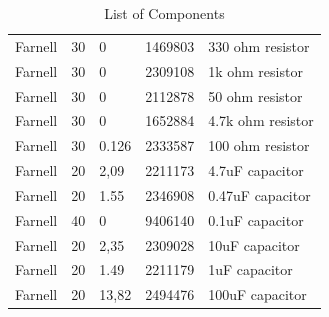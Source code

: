 \begin{table}[h]
\begin{tabular}{lllll}
        Farnell     & 30     & 0             & 1469803                & 330 ohm resistor            \\
        Farnell     & 30     & 0             & 2309108                & 1k ohm resistor             \\
        Farnell     & 30     & 0             & 2112878                & 50 ohm resistor             \\
        Farnell     & 30     & 0             & 1652884                & 4.7k ohm resistor           \\
        Farnell     & 30     & 0.126         & 2333587                & 100 ohm resistor            \\
        Farnell     & 20     & 2,09          & 2211173                & 4.7uF capacitor             \\
        Farnell     & 20     & 1.55          & 2346908                & 0.47uF capacitor            \\
        Farnell     & 40     & 0             & 9406140                & 0.1uF capacitor             \\
        Farnell     & 20     & 2,35          & 2309028                & 10uF capacitor              \\
        Farnell     & 20     & 1.49          & 2211179                & 1uF capacitor               \\
        Farnell     & 20     & 13,82         & 2494476                & 100uF capacitor
    \end{tabular}
    \caption{List of Components}
    \label{listofcomponents}
\end{table}

